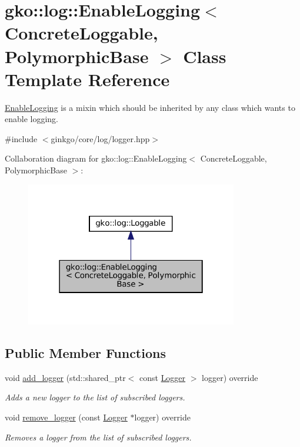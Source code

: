 \hypertarget{classgko_1_1log_1_1EnableLogging}{}\section{gko\+:\+:log\+:\+:Enable\+Logging$<$ Concrete\+Loggable, Polymorphic\+Base $>$ Class Template Reference}
\label{classgko_1_1log_1_1EnableLogging}


\hyperlink{classgko_1_1log_1_1EnableLogging}{Enable\+Logging} is a mixin which should be inherited by any class which wants to enable logging.  




{\ttfamily \#include $<$ginkgo/core/log/logger.\+hpp$>$}



Collaboration diagram for gko\+:\+:log\+:\+:Enable\+Logging$<$ Concrete\+Loggable, Polymorphic\+Base $>$\+:
\nopagebreak
\begin{figure}[H]
\begin{center}
\leavevmode
\includegraphics[width=262pt]{classgko_1_1log_1_1EnableLogging__coll__graph}
\end{center}
\end{figure}
\subsection*{Public Member Functions}
\begin{DoxyCompactItemize}
\item 
void \hyperlink{classgko_1_1log_1_1EnableLogging_a7b3493c14a37b4d46487d9c636d784f2}{add\+\_\+logger} (std\+::shared\+\_\+ptr$<$ const \hyperlink{classgko_1_1log_1_1Logger}{Logger} $>$ logger) override
\begin{DoxyCompactList}\small\item\em Adds a new logger to the list of subscribed loggers. \end{DoxyCompactList}\item 
void \hyperlink{classgko_1_1log_1_1EnableLogging_aba5317f8a03956a61d770e9b07fc65cc}{remove\+\_\+logger} (const \hyperlink{classgko_1_1log_1_1Logger}{Logger} $\ast$logger) override
\begin{DoxyCompactList}\small\item\em Removes a logger from the list of subscribed loggers. \end{DoxyCompactList}\end{DoxyCompactItemize}



